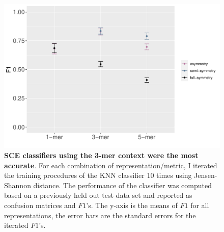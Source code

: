 \begin{figure}[h!]
    \centering
    \includegraphics[scale=0.8]{graphics/f1_sce.pdf}
    \caption{\textbf{SCE classifiers using the 3-mer context  were the most accurate}. For each combination of representation/metric, I iterated the training procedures of the KNN classifier 10 times using Jensen-Shannon distance. The performance of the classifier was computed based on a previously held out test data set and reported as confusion matrices and $F1$'s. The y-axis is the means of $F1$ for all representations, the error bars are the standard errors for the iterated $F1$’s.}
    \label{fig:f1_sce}
\end{figure}
